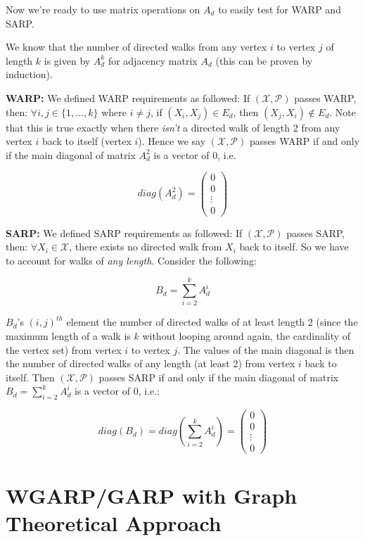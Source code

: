\documentclass{article} %
\begin{document}
Now we're ready to use matrix operations on $A_d$ to easily test for WARP and SARP.


We know that the number of directed walks from any vertex $i$ to vertex $j$ of length $k$ is given by $A^k_d$  for adjacency matrix $A_d$ (this can be proven by induction). 


\textbf{WARP:} We defined WARP requirements as followed: If $(\mathcal{X},\mathcal{P})$ passes WARP, then: $\forall i,j\in\{1,\dots,k\}$ where $i\not=j$, if $(X_i,X_j)\in E_d$, then $(X_j, X_i)\not\in E_d$. Note that this is true exactly when there \textit{isn't} a directed walk of length 2 from any vertex $i$ back to itself (vertex $i$). Hence we say $(\mathcal{X},\mathcal{P})$ passes WARP if and only if the main diagonal of matrix $A_d^2$ is a vector of 0, i.e.

\[
diag(A_d^2) =
 \begin{pmatrix}
  0 \\
  0 \\
  \vdots \\
  0
 \end{pmatrix}
\]

\textbf{SARP:} We defined SARP requirements as followed: If $(\mathcal{X},\mathcal{P})$ passes SARP, then: $\forall X_i \in \mathcal{X}$, there exists no directed walk from $X_i$ back to itself. So we have to account for walks of \textit{any length}. Consider the following:

$$B_d=\sum_{i=2}^{k}A_d^i$$

$B_d$'s $(i,j)^{th}$ element the number of directed walks of at least length 2 (since the maximum length of a walk is $k$ without looping around again, the cardinality of the vertex set) from vertex $i$ to vertex $j$. The values of the main diagonal is then the number of directed walks of any length (at least 2) from vertex $i$ back to itself. Then $(\mathcal{X},\mathcal{P})$ passes SARP if and only if the main diagonal of matrix $B_d=\sum_{i=2}^{k}A_d^i$ is a vector of 0, i.e.:

\[
diag(B_d) = diag(\sum_{i=2}^{k}A_d^i)=
 \begin{pmatrix}
  0 \\
  0 \\
  \vdots \\
  0
 \end{pmatrix}
\]

\section{WGARP/GARP with Graph Theoretical Approach}
\end{document}
